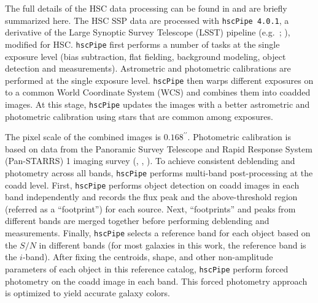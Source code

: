 \documentclass{emulateapj}
\def\arcsec{{\prime\prime}}
\begin{document}
\begin{CJK*}{UTF8}{gbsn}
    The full details of the HSC data processing can be found in \citet{BoschInPrep}
    and are briefly summarized here. 
    The HSC SSP data are processed with \texttt{hscPipe 4.0.1}, a derivative of the 
    Large Synoptic Survey Telescope (LSST) pipeline (e.g.\ \citealt{Juric2015}; 
    \citealt{Axelrod2010}), modified for HSC. 
    \texttt{hscPipe} first performs a number of tasks at the single exposure level 
    (bias subtraction, flat fielding, background modeling, object detection and 
    measurements). 
    Astrometric and photometric calibrations are performed at the single exposure level. 
    \texttt{hscPipe} then warps different exposures on to a common World Coordinate 
    System (WCS) and combines them into coadded images. 
    At this stage, \texttt{hscPipe} updates the images with a better astrometric and 
    photometric calibration using stars that are common among exposures. 
    
    The pixel scale of the combined images is $0.168^{\arcsec}$. 
    Photometric calibration is based on data from the Panoramic Survey Telescope 
    and Rapid Response System (Pan-STARRS) 1 imaging survey 
    (\citealt{Schlafly2012}, \citealt{Tonry2012}, \citealt{Magnier2013}). 
    To achieve consistent deblending and photometry across all bands, \texttt{hscPipe} 
    performs multi-band post-processing at the coadd level. 
    First, \texttt{hscPipe} performs object detection on coadd images in each band 
    independently and records the flux peak and the above-threshold region 
    (referred as a ``footprint'') for each source. 
    Next, ``footprints'' and peaks from different bands are merged together before     
    performing deblending and measurements. 
    Finally, \texttt{hscPipe} selects a reference band for each object based on the 
    $S/N$ in different bands (for most galaxies in this work, the reference band is 
    the $i$-band). 
    After fixing the centroids, shape, and other non-amplitude parameters of each 
    object in this reference catalog, \texttt{hscPipe} perform forced photometry 
    on the coadd image in each band. 
    This forced photometry approach is optimized to yield accurate galaxy colors. 
       

\end{CJK*}
\end{document}
